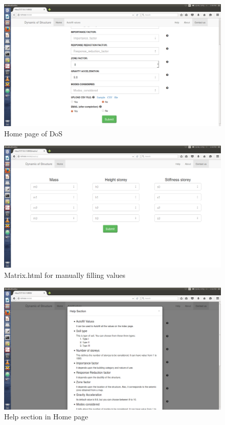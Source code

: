 \begin{figure}[!h]
\centering \includegraphics[scale=0.32]{images/output/1.png}
\caption{Home page of DoS}
\end{figure}
\begin{figure}[!h]
\centering \includegraphics[scale=0.32]{images/output/2.png}
\caption{Matrix.html for manually filling values}
\end{figure}
\newpage
\begin{figure}[!h]
\centering \includegraphics[scale=0.31]{images/output/3.png}
\caption{Help section in Home page}
\end{figure}
